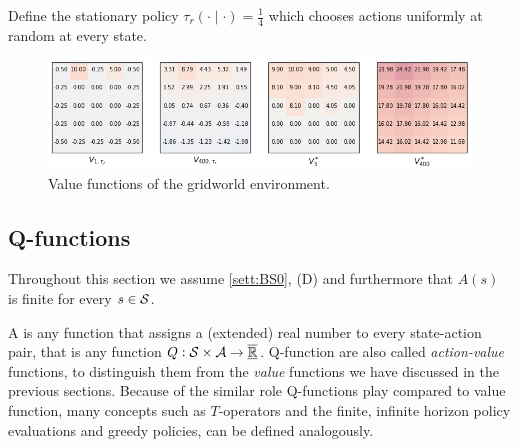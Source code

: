 \begin{example}[Gridworld]
  Define the stationary policy $\tau_r(\cdot \mid \cdot) = \frac{1}{4}$ which
  chooses actions uniformly at random at every state.

  \begin{figure}[h]
    \centering
    \includegraphics[scale=0.7]{figs/gridworld1.png}
    \caption{Value functions of the gridworld environment.}
  \end{figure}

  \label{ex:gridworld}
\end{example}

\subsection{Q-functions}
Throughout this section we assume \cref{sett:BS0}, (D) and furthermore that
$A(s)$ is finite for every $s \in \mathcal{S}$.

A  is any function that assigns a (extended) real number
to every state-action pair, that is any function $Q : \mathcal{S} \times \mathcal{A}
\to \overline{\underline{\mathbb{R}}}$. Q-function are also called \emph{action-value} functions,
to distinguish them from the \emph{value} functions we have discussed in the
previous sections.
Because of the similar role Q-functions play compared to value function,
many concepts such as $T$-operators and the finite, infinite horizon
policy evaluations and greedy policies, can be defined analogously.

